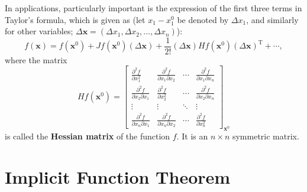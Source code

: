 \documentclass[11pt]{../../TexTemplate/elegantbook}
\begin{document}
In applications, particularly important is the expression of the first three terms in Taylor's formula, which is given as
(let \(x_1 - x_1^0\) be denoted by \(\Delta x_1\), and similarly for other variables;
\(\Delta \mathbf{x} = (\Delta x_1, \Delta x_2, \dots, \Delta x_n)\)):
\[
    f(\mathbf{x}) = f(\mathbf{x}^0) + Jf(\mathbf{x}^0)(\Delta\mathbf{x})
    + \frac{1}{2!}(\Delta\mathbf{x})Hf(\mathbf{x}^0)(\Delta \mathbf{x})^{\mathrm{T}}+ \cdots,
\]
where the matrix
\[
Hf(\mathbf{x}^0) =
\begin{bmatrix}
\frac{\partial^2 f}{\partial x_1^2} & \frac{\partial^2 f}{\partial x_1 \partial x_2} 
    & \cdots & \frac{\partial^2 f}{\partial x_1 \partial x_n} \\
\frac{\partial^2 f}{\partial x_2 \partial x_1} & \frac{\partial^2 f}{\partial x_2^2} 
    & \cdots & \frac{\partial^2 f}{\partial x_2 \partial x_n} \\
\vdots & \vdots & \ddots & \vdots \\
\frac{\partial^2 f}{\partial x_n \partial x_1} & \frac{\partial^2 f}{\partial x_n \partial x_2} 
    & \cdots & \frac{\partial^2 f}{\partial x_n^2}
\end{bmatrix}_{\mathbf{x}^0}
\]
is called the \textbf{Hessian matrix} of the function \(f\). It is an \(n \times n\) symmetric matrix.


\section{Implicit Function Theorem}
\end{document}
